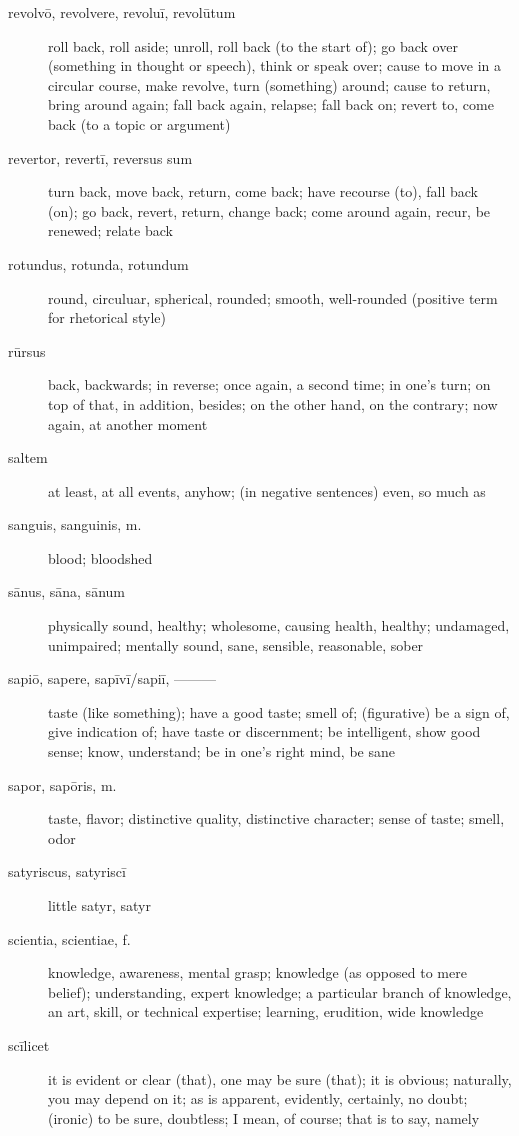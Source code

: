 \begin{description}
    \item[revolvō, revolvere, revoluī, revolūtum] roll back, roll aside; unroll, roll back (to the start of); go back over (something in thought or speech), think or speak over; cause to move in a circular course, make revolve, turn (something) around; cause to return, bring around again; fall back again, relapse; fall back on; revert to, come back (to a topic or argument)
    \item[revertor, revertī, reversus sum] turn back, move back, return, come back; have recourse (to), fall back (on); go back, revert, return, change back; come around again, recur, be renewed; relate back
    \item[rotundus, rotunda, rotundum] round, circuluar, spherical, rounded; smooth, well-rounded (positive term for rhetorical style)
    \item[rūrsus] back, backwards; in reverse; once again, a second time; in one's turn; on top of that, in addition, besides; on the other hand, on the contrary; now again, at another moment
    \item[saltem] at least, at all events, anyhow; (in negative sentences) even, so much as
    \item[sanguis, sanguinis, m.] blood; bloodshed
    \item[sānus, sāna, sānum] physically sound, healthy; wholesome, causing health, healthy; undamaged, unimpaired; mentally sound, sane, sensible, reasonable, sober
    \item[sapiō, sapere, sapīvī/sapiī, ———] taste (like something); have a good taste; smell of; (figurative) be a sign of, give indication of; have taste or discernment; be intelligent, show good sense; know, understand; be in one's right mind, be sane
    \item[sapor, sapōris, m.] taste, flavor; distinctive quality, distinctive character; sense of taste; smell, odor
    \item[satyriscus, satyriscī] little satyr, satyr
    \item[scientia, scientiae, f.] knowledge, awareness, mental grasp; knowledge (as opposed to mere belief); understanding, expert knowledge; a particular branch of knowledge, an art, skill, or technical expertise; learning, erudition, wide knowledge
    \item[scīlicet] it is evident or clear (that), one may be sure (that); it is obvious; naturally, you may depend on it; as is apparent, evidently, certainly, no doubt; (ironic) to be sure, doubtless; I mean, of course; that is to say, namely

\end{description}
